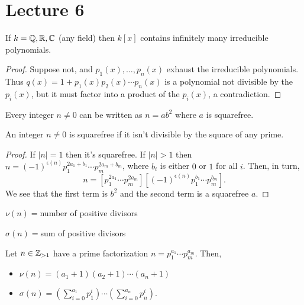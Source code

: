 \documentclass{article}
\begin{document}
\section{Lecture 6}
\begin{proposition}
    If $k = \mathbb Q, \mathbb R, \mathbb C$ (any field) then $k[x]$ contains infinitely many irreducible polynomials.
\end{proposition}

\begin{proof}
    Suppose not, and $p_1(x), \ldots, p_n(x)$ exhaust the irreducible polynomials. Thus $q(x) = 1 + p_1(x)p_2(x) \cdots p_n(x)$ is a polynomial not divisible by the $p_i(x)$, but it must factor into a product of the $p_i(x)$, a contradiction. 
\end{proof}

\begin{lemma}
    Every integer $n \neq 0$ can be written as $n = ab^2$ where $a$ is squarefree.
\end{lemma}

\begin{definition}
    An integer $n \neq 0$ is squarefree if it isn't divisible by the square of any prime.
\end{definition}

\begin{proof}
    If $|n| = 1$ then it's squarefree. If $|n| > 1$ then $n = (-1)^{\epsilon(n)} p_1^{2a_1 + b_1} \cdots p_m^{2a_m + b_m}$, where $b_i$ is either $0$ or $1$ for all $i$. Then, in turn, \[n = [p_1^{2a_1}\cdots p_m^{2a_m}][(-1)^{\epsilon(n)} p_1^{b_1}\cdots p_m^{b_m}].\] We see that the first term is $b^2$ and the second term is a squarefree $a$.
\end{proof}

\begin{definition}
    $\nu(n) = $number of positive divisors 

    $\sigma(n) = $sum of positive divisors 
\end{definition}

\begin{proposition}
    Let $n \in \mathbb Z_{> 1}$ have a prime factorization $n = p_1^{a_1} \cdots p_m^{a_m}$. Then,
    \begin{itemize}
        \item $\nu(n) = (a_1 + 1)(a_2 + 1)\cdots(a_n + 1)$
        \item $\sigma(n) = \left(\sum_{i = 0}^{a_1} p_1^i\right) \cdots \left(\sum_{i = 0}^{a_n} p_n^i\right)$.
    \end{itemize}
\end{proposition}
\end{document}
